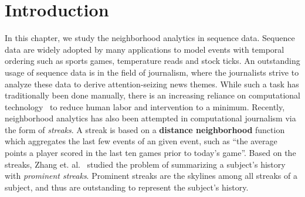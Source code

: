 \section{Introduction}
In this chapter, we study the neighborhood analytics in sequence data.
Sequence data are widely adopted by many applications 
to model events with temporal ordering such as
sports games, temperature reads and stock ticks.
An outstanding usage of sequence data is in the field of journalism,
where the journalists strive to
analyze these data to derive attention-seizing news themes. 
While such a task has traditionally been done manually,
there is an increasing reliance on computational technology~\cite{sultana2014incremental,wu2012one,hassan2014data} 
to reduce human labor and intervention to a minimum. Recently,
neighborhood analytics has also been attempted in computational journalism
via the form of \emph{streaks}. A streak is  based on
a \textbf{distance neighborhood} function which aggregates the last few events
of an given event, such as ``the average points a player scored in the last ten games prior to today's game''. 
Based on the streaks, Zhang et. al.~\cite{zhang2014discovering} studied the problem
of summarizing a subject's history with \emph{prominent streaks}. Prominent streaks
are the skylines among all streaks of a subject, and thus are outstanding to represent the subject's history.
%


